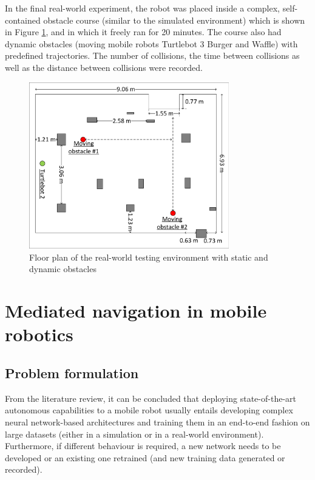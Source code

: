 In the final real-world experiment, the robot was placed inside a complex, self-contained obstacle course (similar to the simulated environment) which is shown in Figure \ref{fig:Fig12}, and in which it freely ran for 20 minutes. The course also had dynamic obstacles (moving mobile robots Turtlebot 3 Burger and Waffle) with predefined trajectories. The number of collisions, the time between collisions as well as the distance between collisions were recorded. 

\begin{figure}
    \centering
    \includegraphics[width=0.775\textwidth]{slike/turkish/Fig12a.pdf}
    \caption{Floor plan of the real-world testing environment with static and dynamic obstacles}
    \label{fig:Fig12}
\end{figure}

\section{Mediated navigation in mobile robotics}
\label{sec:MMMediation}

\subsection{Problem formulation}
\label{sec:MMMediationFormulation}

From the literature review, it can be concluded that deploying state-of-the-art autonomous capabilities to a mobile robot usually entails developing complex neural network-based architectures and training them in an end-to-end fashion on large datasets (either in a simulation or in a real-world environment). Furthermore, if different behaviour is required, a new network needs to be developed or an existing one retrained (and new training data generated or recorded). 

